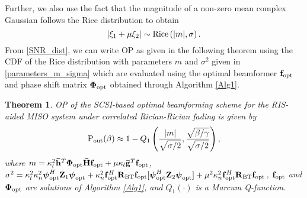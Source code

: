 \documentclass[journal,draftclsnofoot,onecolumn,12pt]{IEEEtran}
\newtheorem{theorem}{Theorem}
\begin{document}
Further, we also use the fact that the magnitude of a non-zero mean complex Gaussian follows the Rice distribution to obtain
\begin{equation}
    |\xi_1 + \mu\xi_2|\sim{\rm Rice}\left(|m|,\sigma\right).\label{SNR_dist}
\end{equation}
From \eqref{SNR_dist}, we can write OP as given in the following theorem using the  CDF of the Rice distribution with parameters $m$ and $\sigma^2$ given in \eqref{parameters_m_sigma} which are evaluated  using the optimal beamformer $\mathbf{f}_{\rm opt}$ and phase shift matrix $\mathbf{\Phi}_{\rm opt}$ obtained through Algorithm \ref{Alg1}. %
\begin{theorem}\label{Theo1}
OP of the SCSI-based optimal beamforming scheme for the RIS-aided MISO system under correlated Rician-Rician fading is given by
\begin{align}
    {\rm P_{out}}(\beta)\approx 1-Q_1\left(\frac{|m|}{\sqrt{\sigma/2}},\frac{\sqrt{\beta/\gamma}}{\sqrt{\sigma/2}}\right),\label{Pout_R1}
\end{align}
where $m =  \kappa_l^2\mathbf{\Bar{h}}^T\mathbf{\Phi_{\rm opt} \mathbf{\Bar{H}} f_{\rm opt}} + \mu \kappa_l\mathbf{\Bar{g}}^T\mathbf{f}_{\rm opt}$, $\sigma^2=  \kappa_l^2\kappa_n^2\boldsymbol{\psi}_{\rm opt}^H\mathbf{Z}_1\boldsymbol{\psi}_{\rm opt} + \kappa_n^2\mathbf{f}_{\rm opt}^H\mathbf{R}_{\rm BT}\mathbf{f}_{\rm opt}[\boldsymbol{\psi}_{\rm opt}^H\mathbf{Z}_2\boldsymbol{\psi}_{\rm opt}]+ \mu^2 \kappa_n^2\mathbf{f}_{\rm opt}^H\mathbf{R}_{\rm BT}\mathbf{f}_{\rm opt}$,  
 $\mathbf{f}_{\rm opt}$ and $\mathbf{\Phi}_{\rm opt}$ are solutions of Algorithm \ref{Alg1}, and  $Q_1(\cdot)$ is a Marcum Q-function.
\end{theorem}
\end{document}

